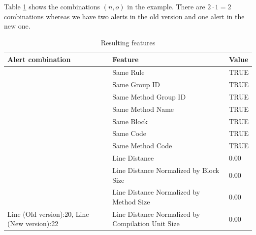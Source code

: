 \documentclass[
]{article}
\begin{document}
Table \ref{table_features} shows the combinations \((n,o)\) in the
example. There are \(2 \cdot 1 = 2\) combinations whereas we have two
alerts in the old version and one alert in the new one.

\small

\begin{table}[!h]

\caption{\label{tab:unnamed-chunk-6}Resulting features\label{table_features} }
\centering
\begin{tabular}[t]{l|l|l}
\hline
Alert combination & Feature & Value\\
\hline
\rowcolor{gray!6}   & Same Rule & TRUE\\

 & Same Group ID & TRUE\\

\rowcolor{gray!6}   & Same Method Group ID & TRUE\\

 & Same Method Name & TRUE\\

\rowcolor{gray!6}   & Same Block & TRUE\\

 & Same Code & TRUE\\

\rowcolor{gray!6}   & Same Method Code & TRUE\\

 & Line Distance & 0.00\\

\rowcolor{gray!6}   & Line Distance Normalized by Block Size & 0.00\\

 & Line Distance Normalized by Method Size & 0.00\\

\multirow[t]{-11}{*}{\raggedright\arraybackslash Line (Old version):20, Line (New version):22} & Line Distance Normalized by Compilation Unit Size & 0.00\\
\hline
\end{tabular}
\end{table}

\normalsize

\small

\normalsize

\newpage
\end{document}
